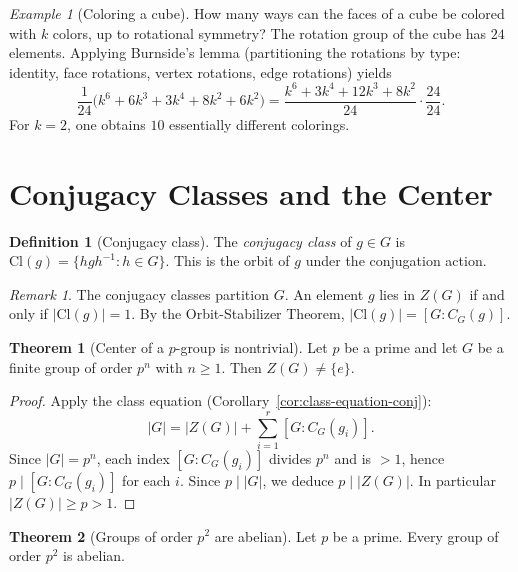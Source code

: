\documentclass[12pt,a4paper,openany]{book}
\theoremstyle{definition}
\newtheorem{definition}{Definition}[chapter]
\newtheorem{theorem}{Theorem}[chapter]
\theoremstyle{remark}
\newtheorem{remark}{Remark}[chapter]
\newtheorem{example}{Example}[chapter]
\begin{document}
\begin{example}[Coloring a cube]\label{ex:burnside-cube}
How many ways can the faces of a cube be colored with $k$ colors, up
to rotational symmetry?  The rotation group of the cube has $24$
elements.  Applying Burnside's lemma (partitioning the rotations by
type: identity, face rotations, vertex rotations, edge rotations)
yields
\[
   \frac{1}{24}\bigl(k^6 + 6k^3 + 3k^4 + 8k^2 + 6k^2\bigr)
   = \frac{k^6+3k^4+12k^3+8k^2}{24} \cdot \frac{24}{24}.
\]
For $k=2$, one obtains $10$ essentially different colorings.
\end{example}

\section{Conjugacy Classes and the Center}\label{sec:conjugacy-classes}

\begin{definition}[Conjugacy class]\label{def:conjugacy-class}
The \emph{conjugacy class} of $g\in G$ is
$\mathrm{Cl}(g) = \{hgh^{-1} : h\in G\}$.
This is the orbit of $g$ under the conjugation action.
\end{definition}

\begin{remark}\label{rem:conjugacy-partition}
The conjugacy classes partition $G$.  An element $g$ lies in $Z(G)$
if and only if $|\mathrm{Cl}(g)|=1$.  By the Orbit-Stabilizer
Theorem, $|\mathrm{Cl}(g)|=[G:C_G(g)]$.
\end{remark}

\begin{theorem}[Center of a $p$-group is nontrivial]\label{thm:p-group-center}
Let $p$ be a prime and let $G$ be a finite group of order $p^n$ with
$n\ge 1$.  Then $Z(G)\ne\{e\}$.
\end{theorem}

\begin{proof}
Apply the class equation (Corollary~\ref{cor:class-equation-conj}):
\[
   |G| = |Z(G)| + \sum_{i=1}^{r} [G:C_G(g_i)].
\]
Since $|G|=p^n$, each index $[G:C_G(g_i)]$ divides $p^n$ and is
$>1$, hence $p\mid [G:C_G(g_i)]$ for each $i$.  Since $p\mid |G|$,
we deduce $p\mid |Z(G)|$.  In particular $|Z(G)|\ge p>1$.
\end{proof}

\begin{theorem}[Groups of order $p^2$ are abelian]\label{thm:p2-abelian}
Let $p$ be a prime.  Every group of order $p^2$ is abelian.
\end{theorem}
\end{document}
